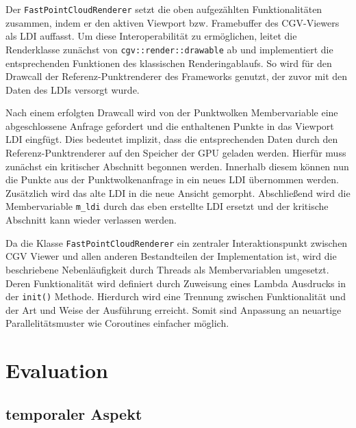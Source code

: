 \documentclass[hyperref, beleg, german]{cgvpub}
\begin{document}
Der \texttt{FastPointCloudRenderer} setzt die oben aufgezählten
Funktionalitäten zusammen, indem er den aktiven Viewport bzw. Framebuffer des
CGV-Viewers als LDI auffasst. Um diese Interoperabilität zu ermöglichen, leitet
die Renderklasse zunächst von \texttt{cgv::render::drawable} ab und
implementiert die entsprechenden Funktionen des klassischen Renderingablaufs.
So wird für den Drawcall der Referenz-Punktrenderer des Frameworks genutzt, der
zuvor mit den Daten des LDIs versorgt wurde.

Nach einem erfolgten Drawcall wird von der Punktwolken Membervariable eine
abgeschlossene Anfrage gefordert und die enthaltenen Punkte in das Viewport LDI
eingfügt. Dies bedeutet implizit, dass die entsprechenden Daten durch den
Referenz-Punktrenderer auf den Speicher der GPU geladen werden. Hierfür muss
zunächst ein kritischer Abschnitt begonnen werden. Innerhalb diesem können nun
die Punkte aus der Punktwolkenanfrage in ein neues LDI übernommen werden.
Zusätzlich wird das alte LDI in die neue Ansicht gemorpht. Abschließend wird die
Membervariable \texttt{m\_ldi} durch das eben erstellte LDI ersetzt und der
kritische Abschnitt kann wieder verlassen werden.

Da die Klasse \texttt{FastPointCloudRenderer} ein zentraler Interaktionspunkt
zwischen CGV Viewer und allen anderen Bestandteilen der Implementation ist, wird
die beschriebene Nebenläufigkeit durch Threads als Membervariablen umgesetzt.
Deren Funktionalität wird definiert durch Zuweisung eines Lambda Ausdrucks in
der \texttt{init()} Methode. Hierdurch wird eine Trennung zwischen
Funktionalität und der Art und Weise der Ausführung erreicht. Somit sind
Anpassung an neuartige Parallelitätsmuster wie Coroutines einfacher möglich.

\chapter{Evaluation}

\section{temporaler Aspekt}
\end{document}
